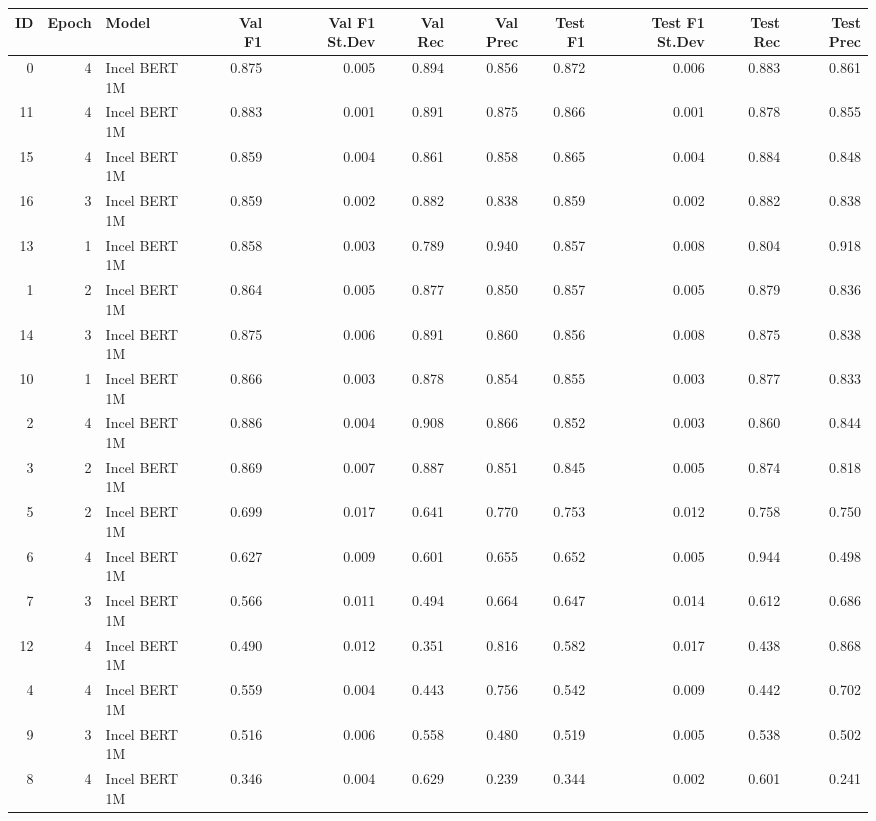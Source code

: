 \begin{tabular}{rrlrrrrrrrr}
\toprule
 ID &  Epoch &         Model &  Val F1 &  Val F1 St.Dev &  Val Rec &  Val Prec &  Test F1 &  Test F1 St.Dev &  Test Rec &  Test Prec \\
\midrule
  0 &      4 & Incel BERT 1M &   0.875 &          0.005 &    0.894 &     0.856 &    0.872 &           0.006 &     0.883 &      0.861 \\
 11 &      4 & Incel BERT 1M &   0.883 &          0.001 &    0.891 &     0.875 &    0.866 &           0.001 &     0.878 &      0.855 \\
 15 &      4 & Incel BERT 1M &   0.859 &          0.004 &    0.861 &     0.858 &    0.865 &           0.004 &     0.884 &      0.848 \\
 16 &      3 & Incel BERT 1M &   0.859 &          0.002 &    0.882 &     0.838 &    0.859 &           0.002 &     0.882 &      0.838 \\
 13 &      1 & Incel BERT 1M &   0.858 &          0.003 &    0.789 &     0.940 &    0.857 &           0.008 &     0.804 &      0.918 \\
  1 &      2 & Incel BERT 1M &   0.864 &          0.005 &    0.877 &     0.850 &    0.857 &           0.005 &     0.879 &      0.836 \\
 14 &      3 & Incel BERT 1M &   0.875 &          0.006 &    0.891 &     0.860 &    0.856 &           0.008 &     0.875 &      0.838 \\
 10 &      1 & Incel BERT 1M &   0.866 &          0.003 &    0.878 &     0.854 &    0.855 &           0.003 &     0.877 &      0.833 \\
  2 &      4 & Incel BERT 1M &   0.886 &          0.004 &    0.908 &     0.866 &    0.852 &           0.003 &     0.860 &      0.844 \\
  3 &      2 & Incel BERT 1M &   0.869 &          0.007 &    0.887 &     0.851 &    0.845 &           0.005 &     0.874 &      0.818 \\
  5 &      2 & Incel BERT 1M &   0.699 &          0.017 &    0.641 &     0.770 &    0.753 &           0.012 &     0.758 &      0.750 \\
  6 &      4 & Incel BERT 1M &   0.627 &          0.009 &    0.601 &     0.655 &    0.652 &           0.005 &     0.944 &      0.498 \\
  7 &      3 & Incel BERT 1M &   0.566 &          0.011 &    0.494 &     0.664 &    0.647 &           0.014 &     0.612 &      0.686 \\
 12 &      4 & Incel BERT 1M &   0.490 &          0.012 &    0.351 &     0.816 &    0.582 &           0.017 &     0.438 &      0.868 \\
  4 &      4 & Incel BERT 1M &   0.559 &          0.004 &    0.443 &     0.756 &    0.542 &           0.009 &     0.442 &      0.702 \\
  9 &      3 & Incel BERT 1M &   0.516 &          0.006 &    0.558 &     0.480 &    0.519 &           0.005 &     0.538 &      0.502 \\
  8 &      4 & Incel BERT 1M &   0.346 &          0.004 &    0.629 &     0.239 &    0.344 &           0.002 &     0.601 &      0.241 \\
\hline
\end{tabular}
